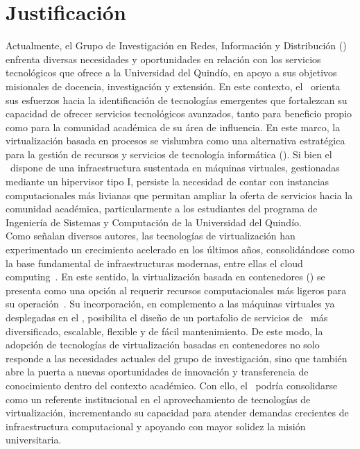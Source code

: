 \chapter*{Justificación}
\label{cap:justificacion}
Actualmente, el Grupo de Investigación en Redes, Información y Distribución 
(\GRID) enfrenta diversas necesidades y oportunidades en relación con los servicios 
tecnológicos que ofrece a la Universidad del Quindío, en apoyo a sus objetivos 
misionales de docencia, investigación y extensión. En este contexto, el \GRID\ 
orienta sus esfuerzos hacia la identificación de tecnologías emergentes que fortalezcan 
su capacidad de ofrecer servicios tecnológicos avanzados, tanto para beneficio propio 
como para la comunidad académica de su área de influencia. En este marco, la virtualización basada en procesos se vislumbra como una alternativa 
estratégica para la gestión de recursos y servicios de tecnología informática 
(\TI). Si bien el \GRID\ dispone de una infraestructura sustentada en máquinas virtuales, 
gestionadas mediante un hipervisor tipo I, persiste la necesidad de contar con instancias 
computacionales más livianas que permitan ampliar la oferta de servicios hacia la comunidad 
académica, particularmente a los estudiantes del programa de Ingeniería de Sistemas y 
Computación de la Universidad del Quindío.\\
Como señalan diversos autores, las tecnologías de virtualización han experimentado un 
crecimiento acelerado en los últimos años, consolidándose como la base fundamental de 
infraestructuras modernas, entre ellas el cloud computing~\citep{Sepulveda-Rodriguez2022}. 
En este sentido, la virtualización basada en contenedores (\VBC) se presenta como una opción 
al requerir recursos computacionales más ligeros para su operación~\citep{Xavier2013}. 
Su incorporación, en complemento a las máquinas virtuales ya desplegadas en el \GRID, 
posibilita el diseño de un portafolio de servicios de \TI\ más diversificado, escalable, 
flexible y de fácil mantenimiento. De este modo, la adopción de tecnologías de virtualización basadas en contenedores no solo 
responde a las necesidades actuales del grupo de investigación, sino que también abre la 
puerta a nuevas oportunidades de innovación y transferencia de conocimiento dentro del 
contexto académico. Con ello, el \GRID\ podría consolidarse como un referente institucional 
en el aprovechamiento de tecnologías de virtualización, incrementando su capacidad para 
atender demandas crecientes de infraestructura computacional y apoyando con mayor solidez 
la misión universitaria.